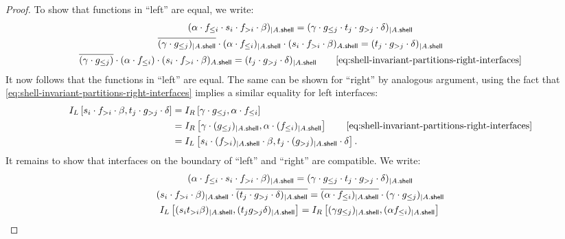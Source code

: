 \begin{proof}
    To show that functions in ``left'' are equal, we write:
    \begin{gather*}
        (\alpha \cdot f_{\leq i} \cdot s_i \cdot f_{>i} \cdot \beta)_{| \shell{A}} = (\gamma \cdot g_{\leq j} \cdot t_j \cdot g_{>j} \cdot \delta)_{| \shell{A}} \\
        \inv{(\gamma \cdot g_{\leq j})_{| \shell{A}}} \cdot (\alpha \cdot f_{\leq i})_{| \shell{A}} \cdot (s_i \cdot f_{>i} \cdot \beta)_{\shell{A}} = (t_j \cdot g_{>j} \cdot \delta)_{| \shell{A}} \\
        \inv{(\gamma \cdot g_{\leq j})} \cdot (\alpha \cdot f_{\leq i}) \cdot (s_i \cdot f_{>i} \cdot \beta)_{\shell{A}} = (t_j \cdot g_{>j} \cdot \delta)_{| \shell{A}} \tag*{\eqref{eq:shell-invariant-partitions-right-interfaces}}
    \end{gather*}
    It now follows that the functions in ``left'' are equal. The same can be shown for ``right'' by analogous argument, using the fact that \eqref{eq:shell-invariant-partitions-right-interfaces} implies a similar equality for left interfaces:
    \begin{align*}
        \lint{s_i \cdot f_{>i} \cdot \beta}{t_j \cdot g_{>j} \cdot \delta} &= \rint{\gamma \cdot g_{\leq j}}{\alpha \cdot f_{\leq i}} \\
          &= \rint{\gamma \cdot (g_{\leq j})_{| \shell{A}}}{\alpha \cdot (f_{\leq i})_{| \shell{A}}} \tag*{\eqref{eq:shell-invariant-partitions-right-interfaces}} \\
          &= \lint{s_i \cdot (f_{>i})_{| \shell{A}} \cdot \beta}{t_j \cdot (g_{>j})_{| \shell{A}} \cdot \delta}.
    \end{align*}
    It remains to show that interfaces on the boundary of ``left'' and ``right'' are compatible. We write:
    \begin{gather*}
        (\alpha \cdot f_{\leq i} \cdot s_i \cdot f_{>i} \cdot \beta)_{| A . \mathsf{shell}} = (\gamma \cdot g_{\leq j} \cdot t_j \cdot g_{>j} \cdot \delta)_{| A . \mathsf{shell}} \\
        (s_i \cdot f_{>i} \cdot \beta)_{| A . \mathsf{shell}} \cdot \overline{(t_j \cdot g_{>j} \cdot \delta)_{| A . \mathsf{shell}}} = \overline{(\alpha \cdot f_{\leq i})_{| A . \mathsf{shell}}} \cdot (\gamma \cdot g_{\leq j})_{| A . \mathsf{shell}} \\
        I_L \left[ (s_i t_{>i} \beta)_{| A . \mathsf{shell}}, (t_j g_{>j} \delta)_{| A . \mathsf{shell}} \right] = I_R \left[ (\gamma g_{\leq j})_{| A . \mathsf{shell}}, (\alpha f_{\leq i})_{| A . \mathsf{shell}} \right] \qedhere
    \end{gather*}
\end{proof}

